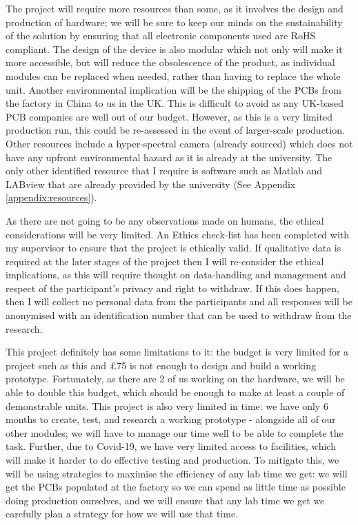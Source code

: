 \documentclass[twoside,twocolumn]{article}
\begin{document}
The project will require more resources than some, as it involves the design and production of hardware; we will be sure to keep our minds on the sustainability of the solution by ensuring that all electronic components used are RoHS compliant. The design of the device is also modular which not only will make it more accessible, but will reduce the obsolescence of the product, as individual modules can be replaced when needed, rather than having to replace the whole unit. Another environmental implication will be the shipping of the PCBs from the factory in China to us in the UK. This is difficult to avoid as any UK-based PCB companies are well out of our budget. However, as this is a very limited production run, this could be re-assessed in the event of larger-scale production. Other resources include a hyper-spectral camera (already sourced) which does not have any upfront environmental hazard as it is already at the university. The only other identified resource that I require is software such as Matlab and LABview that are already provided by the university (See Appendix \ref{appendix:resources}).

As there are not going to be any observations made on humans, the ethical considerations will be very limited. An Ethics check-list has been completed with my supervisor to ensure that the project is ethically valid. If qualitative data is required at the later stages of the project then I will re-consider the ethical implications, as this will require thought on data-handling and management and respect of the participant's privacy and right to withdraw. If this does happen, then I will collect no personal data from the participants and all responses will be anonymised with an identification number that can be used to withdraw from the research.

This project definitely has some limitations to it: the budget is very limited for a project such as this and £75 is not enough to design and build a working prototype. Fortunately, as there are 2 of us working on the hardware, we will be able to double this budget, which should be enough to make at least a couple of demonstrable units. This project is also very limited in time: we have only 6 months to create, test, and research a working prototype - alongside all of our other modules; we will have to manage our time well to be able to complete the task. Further, due to Covid-19, we have very limited access to facilities, which will make it harder to do effective testing and production. To mitigate this, we will be using strategies to maximise the efficiency of any lab time we get: we will get the PCBs populated at the factory so we can spend as little time  as possible doing production ourselves, and we will ensure that any lab time we get we carefully plan a strategy for how we will use that time. 
\end{document}
